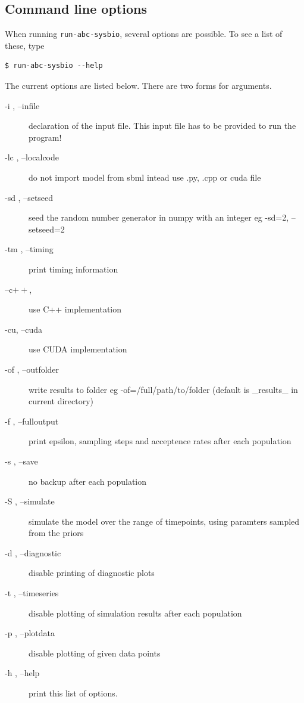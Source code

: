 \documentclass[a4paper]{report}
\begin{document}
\subsection{Command line options}
When running \verb$run-abc-sysbio$, several options are possible. To see a list of these, type
\begin{verbatim}
$ run-abc-sysbio --help
\end{verbatim}
The current options are listed below. There are two forms for arguments.
\begin{description}
\item [ -i  ,    --infile] declaration of the input file. This input file has to be provided to run the program!
\item[-lc ,    --localcode]    do not import model from sbml intead use .py, .cpp or cuda file
\item[-sd   ,  --setseed]        seed the random number generator in numpy with an integer eg -sd=2, --setseed=2
\item[-tm  ,   --timing]         print timing information
\item[--c$\mathbf{++}$, ] use C++ implementation
\item[-cu, --cuda] use CUDA implementation
\item[-of  ,   --outfolder]      write results to folder eg -of=/full/path/to/folder (default is \_results\_ in current directory)
\item[-f   ,   --fulloutput]     print epsilon, sampling steps and acceptence rates after each population
\item[-s  ,    --save]           no backup after each population
\item[-S  ,    --simulate]       simulate the model over the range of timepoints, using paramters sampled from the priors
\item[-d   ,   --diagnostic]     disable printing of diagnostic plots
\item[-t   ,   --timeseries]     disable plotting of simulation results after each population
\item[-p  ,    --plotdata]      disable plotting of given data points
\item[-h  ,    --help]           print this list of options.
\end{description}
\end{document}
